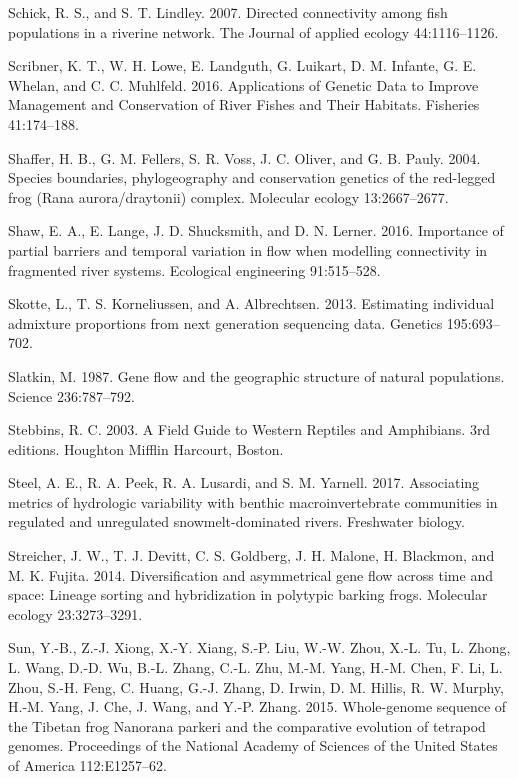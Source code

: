 \documentclass[proquest,12pt,final]{ucthesis-CA2012} %
\begin{document}
\begin{ucmainmatter}
\leavevmode\hypertarget{ref-schick_directed_2007}{}%
Schick, R. S., and S. T. Lindley. 2007. Directed connectivity among fish
populations in a riverine network. The Journal of applied ecology
44:1116--1126.

\leavevmode\hypertarget{ref-scribner_applications_2016}{}%
Scribner, K. T., W. H. Lowe, E. Landguth, G. Luikart, D. M. Infante, G.
E. Whelan, and C. C. Muhlfeld. 2016. Applications of Genetic Data to
Improve Management and Conservation of River Fishes and Their Habitats.
Fisheries 41:174--188.

\leavevmode\hypertarget{ref-shaffer_species_2004}{}%
Shaffer, H. B., G. M. Fellers, S. R. Voss, J. C. Oliver, and G. B.
Pauly. 2004. Species boundaries, phylogeography and conservation
genetics of the red-legged frog (Rana aurora/draytonii) complex.
Molecular ecology 13:2667--2677.

\leavevmode\hypertarget{ref-shaw_importance_2016}{}%
Shaw, E. A., E. Lange, J. D. Shucksmith, and D. N. Lerner. 2016.
Importance of partial barriers and temporal variation in flow when
modelling connectivity in fragmented river systems. Ecological
engineering 91:515--528.

\leavevmode\hypertarget{ref-skotte_estimating_2013}{}%
Skotte, L., T. S. Korneliussen, and A. Albrechtsen. 2013. Estimating
individual admixture proportions from next generation sequencing data.
Genetics 195:693--702.

\leavevmode\hypertarget{ref-slatkin_gene_1987}{}%
Slatkin, M. 1987. Gene flow and the geographic structure of natural
populations. Science 236:787--792.

\leavevmode\hypertarget{ref-stebbins_field_2003}{}%
Stebbins, R. C. 2003. A Field Guide to Western Reptiles and Amphibians.
3rd editions. Houghton Mifflin Harcourt, Boston.

\leavevmode\hypertarget{ref-steel_associating_2017}{}%
Steel, A. E., R. A. Peek, R. A. Lusardi, and S. M. Yarnell. 2017.
Associating metrics of hydrologic variability with benthic
macroinvertebrate communities in regulated and unregulated
snowmelt-dominated rivers. Freshwater biology.

\leavevmode\hypertarget{ref-streicher_diversification_2014}{}%
Streicher, J. W., T. J. Devitt, C. S. Goldberg, J. H. Malone, H.
Blackmon, and M. K. Fujita. 2014. Diversification and asymmetrical gene
flow across time and space: Lineage sorting and hybridization in
polytypic barking frogs. Molecular ecology 23:3273--3291.

\leavevmode\hypertarget{ref-sun_whole-genome_2015}{}%
Sun, Y.-B., Z.-J. Xiong, X.-Y. Xiang, S.-P. Liu, W.-W. Zhou, X.-L. Tu,
L. Zhong, L. Wang, D.-D. Wu, B.-L. Zhang, C.-L. Zhu, M.-M. Yang, H.-M.
Chen, F. Li, L. Zhou, S.-H. Feng, C. Huang, G.-J. Zhang, D. Irwin, D. M.
Hillis, R. W. Murphy, H.-M. Yang, J. Che, J. Wang, and Y.-P. Zhang.
2015. Whole-genome sequence of the Tibetan frog Nanorana parkeri and the
comparative evolution of tetrapod genomes. Proceedings of the National
Academy of Sciences of the United States of America 112:E1257--62.


\end{ucmainmatter}
\end{document}
